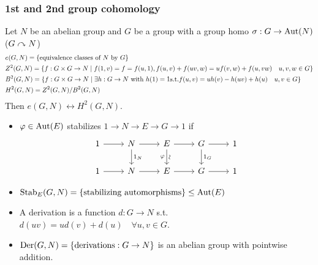 \subsubsection{1st and 2nd group cohomology}
Let $N$ be an abelian group and $G$ be a group with a group homo
$\sigma: G \to \operatorname{Aut}(N)$ ($G \curvearrowright N$)
\begin{align*}
  & e(G, N) = \{ \text{equivalence classes of $N$ by $G$} \} \\
  & Z^2(G, N) = \{
    f: G\times G \to N \mid f(1, v) = f = f(u, 1),
    f(u, v) + f(uv, w) = uf(v, w) + f(u, vw) \quad u, v, w \in G \} \\
  & B^2(G, N) = \{
    f: G\times G \to N \mid \exists h: G\to N \text{~with~} h(1) = 1
    \text{s.t.}
  f(u, v) = uh(v) - h(uv) + h(u) \quad u, v \in G \} \\
  & H^2(G, N) = {Z^2(G, N)}/{B^2(G, N)}
\end{align*}
Then $e(G, N) \leftrightarrow H^2(G, N)$.

\begin{definition} \mbox{}
  \begin{itemize}
    \item $\varphi \in \operatorname{Aut}(E)$ stabilizes $1\to N\to E\to G\to 1$ if
      \[
        \begin{tikzcd}
          1 \arrow[r]
          & N \arrow[d, "1_N"] \arrow[r]
          & E \arrow[d, "\rotatebox{90}{\(\sim\)}", "\varphi"'] \arrow[r]
          & G \arrow[d, "1_G"] \arrow[r]
          & 1 \\
          1 \arrow[r] & N \arrow[r] & E \arrow[r] & G \arrow[r] & 1
        \end{tikzcd}
      \]
    \item $\operatorname{Stab}_E(G, N) = \{ \text{stabilizing automorphisms} \} \le \operatorname{Aut}(E)$
  \end{itemize}
\end{definition}

\begin{definition} \mbox{}
  \begin{itemize}
    \item A derivation is a function $d: G\to N$ s.t. $d(uv) = ud(v) + d(u)
      \quad \forall u, v \in G$.
    \item $\operatorname{Der}(G, N) = \{ \text{derivations} : G\to N \}$ is an abelian group
      with pointwise addition.
  \end{itemize}
\end{definition}

